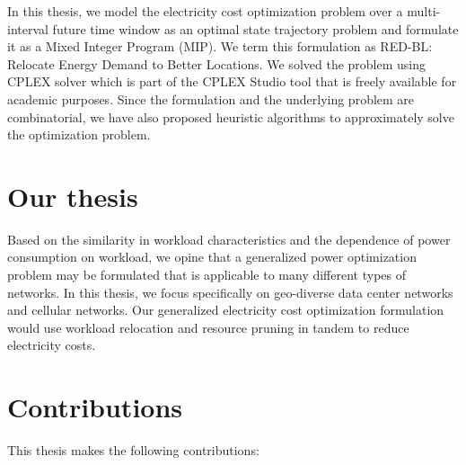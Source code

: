
In this thesis, we model the electricity cost optimization problem over a multi-interval future time window as an optimal state trajectory problem and formulate it as a Mixed Integer Program (MIP). We term this formulation as RED-BL: Relocate Energy Demand to Better Locations. We solved the problem using CPLEX solver which is part of the CPLEX Studio tool that is freely available for academic purposes. Since the formulation and the underlying problem are combinatorial, we have also proposed heuristic algorithms to approximately solve the optimization problem.

\section{Our thesis} Based on the similarity in workload characteristics and the dependence of power consumption on workload, we opine that a generalized power optimization problem may be formulated that is applicable to many different types of networks. In this thesis, we focus specifically on geo-diverse data center networks and cellular networks. Our generalized electricity cost optimization formulation would use workload relocation and resource pruning in tandem to reduce electricity costs.%

\section{Contributions} This thesis makes the following contributions:

